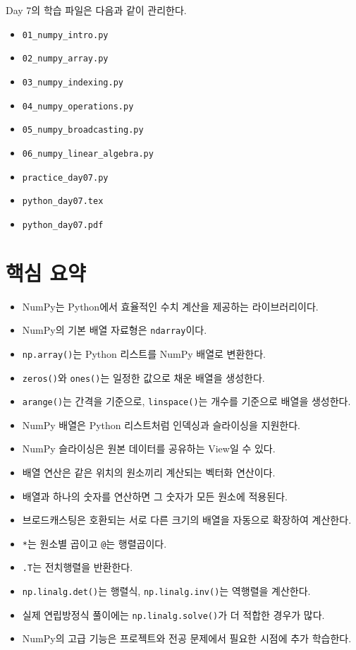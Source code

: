 \documentclass[11pt,a4paper]{article}
\begin{document}
\begin{practicebox}
Day 7의 학습 파일은 다음과 같이 관리한다.
\begin{itemize}[leftmargin=1.5em]
    \item \texttt{01\_numpy\_intro.py}
    \item \texttt{02\_numpy\_array.py}
    \item \texttt{03\_numpy\_indexing.py}
    \item \texttt{04\_numpy\_operations.py}
    \item \texttt{05\_numpy\_broadcasting.py}
    \item \texttt{06\_numpy\_linear\_algebra.py}
    \item \texttt{practice\_day07.py}
    \item \texttt{python\_day07.tex}
    \item \texttt{python\_day07.pdf}
\end{itemize}
\end{practicebox}

\section{핵심 요약}

\begin{itemize}[leftmargin=1.5em]
    \item NumPy는 Python에서 효율적인 수치 계산을 제공하는 라이브러리이다.
    \item NumPy의 기본 배열 자료형은 \texttt{ndarray}이다.
    \item \texttt{np.array()}는 Python 리스트를 NumPy 배열로 변환한다.
    \item \texttt{zeros()}와 \texttt{ones()}는 일정한 값으로 채운 배열을 생성한다.
    \item \texttt{arange()}는 간격을 기준으로, \texttt{linspace()}는 개수를 기준으로 배열을 생성한다.
    \item NumPy 배열은 Python 리스트처럼 인덱싱과 슬라이싱을 지원한다.
    \item NumPy 슬라이싱은 원본 데이터를 공유하는 View일 수 있다.
    \item 배열 연산은 같은 위치의 원소끼리 계산되는 벡터화 연산이다.
    \item 배열과 하나의 숫자를 연산하면 그 숫자가 모든 원소에 적용된다.
    \item 브로드캐스팅은 호환되는 서로 다른 크기의 배열을 자동으로 확장하여 계산한다.
    \item \texttt{*}는 원소별 곱이고 \texttt{@}는 행렬곱이다.
    \item \texttt{.T}는 전치행렬을 반환한다.
    \item \texttt{np.linalg.det()}는 행렬식, \texttt{np.linalg.inv()}는 역행렬을 계산한다.
    \item 실제 연립방정식 풀이에는 \texttt{np.linalg.solve()}가 더 적합한 경우가 많다.
    \item NumPy의 고급 기능은 프로젝트와 전공 문제에서 필요한 시점에 추가 학습한다.
\end{itemize}
\end{document}
